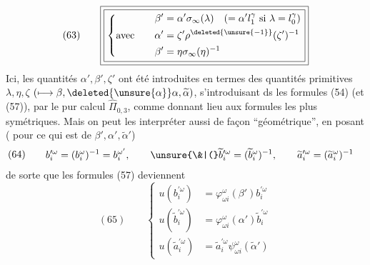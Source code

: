 \[
(63)\qquad\boxed{\boxed{\left\{\begin{aligned}
\beta'&=\alpha'\sigma_\infty(\lambda)\quad(=\alpha'l_1^\gamma\text{ si }\lambda=l_0^\gamma)\\
\text{avec}\qquad\alpha'&=\zeta'\rho^{\deleted{\unsure{-1}}}(\zeta')^{-1}\\
\beta'&=\eta\sigma_\infty(\eta)^{-1}
\end{aligned}\right.}}
\]
Ici, les quantités $\alpha',\beta',\zeta'$ ont été introduites en termes des quantités primitives $\lambda,\eta,\zeta$ $(\longmapsto\beta,\deleted{\unsure{\alpha}}\alpha,\widetilde\alpha)$, s'introduisant ds les formules (54) (et (57)), par le pur calcul   $\widehat\Pi_{0,3}$, comme donnant lieu aux formules les plus symétriques. Mais on peut les interpréter aussi de façon ``géométrique'', en posant ( pour ce qui est de $\beta',\alpha',\widetilde\alpha'$)
\[
(64)\qquad\begin{aligned}
b_i^{\prime\omega}&=(b_i^\omega)^{-1}=b_i^{\omega'},\qquad
\unsure{\&|(}\widetilde b_i^{\prime\omega}=(\widetilde b_i^\omega)^{-1},\qquad
\widetilde a_i^{\prime\omega}=(\widetilde a_i^\omega)^{-1}
\end{aligned}
\]
de sorte que les formules (57) deviennent
\[
(65)\qquad\left\{\begin{aligned}
u(b_i^{\prime\omega})&=\varphi_{\omega i}^\omega(\beta')b_i^{\prime\omega}\\
u(\widetilde b_i^{\prime\omega})&=\varphi_{\omega i}^\omega(\alpha')\widetilde b_i^{\prime\omega}\\
u(\widetilde a_i^{\prime\omega})&=\widetilde a_i^{\prime\omega}\psi_{\omega i}^\omega(\widetilde\alpha')
\end{aligned}\right.
\]
